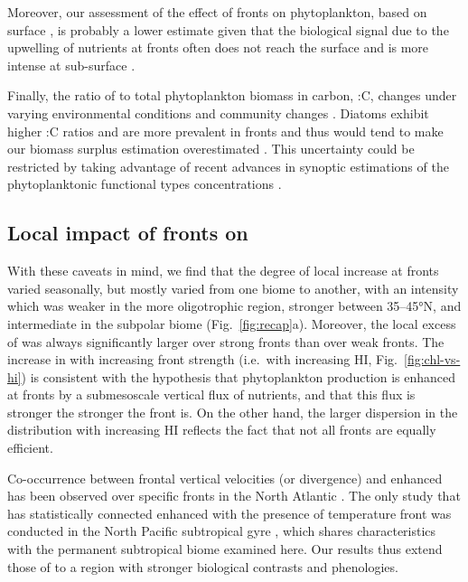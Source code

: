 Moreover, our assessment of the effect of fronts on phytoplankton, based on surface , is probably a lower estimate given that the biological signal due to the upwelling of nutrients at fronts often does not reach the surface and is more intense at sub-surface \citep{mourino_2004, ruiz_2019}.

Finally, the ratio of  to total phytoplankton biomass in carbon, :C, changes under varying environmental conditions and community changes \citep{behrenfeld_2015, halsey_2015, inomura_2022}.
Diatoms exhibit higher :C ratios and are more prevalent in fronts and thus would tend to make our biomass surplus estimation overestimated \citep{treguer_2018}.
This uncertainty could be restricted by taking advantage of recent advances in synoptic estimations of the phytoplanktonic functional types concentrations \citep{elhourany_2019}.

\subsection{Local impact of fronts on }

With these caveats in mind, we find that the degree of local  increase at fronts varied seasonally, but mostly varied from one biome to another, with an intensity which was weaker in the more oligotrophic region, stronger between 35--45°N, and intermediate in the subpolar biome (Fig.~\ref{fig:recap}a).
Moreover, the local excess of  was always significantly larger over strong fronts than over weak fronts.
The increase in  with increasing front strength (i.e.\ with increasing HI, Fig.~\ref{fig:chl-vs-hi}) is consistent with the hypothesis that phytoplankton production is enhanced at fronts by a submesoscale vertical flux of nutrients, and that this flux is stronger the stronger the front is.
On the other hand, the larger dispersion in the  distribution with increasing HI reflects the fact that not all fronts are equally efficient.

Co-occurrence between frontal vertical velocities (or divergence) and enhanced  has been observed over specific fronts in the North Atlantic \citep{mourino_2004, allen_2005, lehahn_2007}.
The only study that has statistically connected enhanced  with the presence of temperature front was conducted in the North Pacific subtropical gyre \citep{liu_2016}, which shares characteristics with the permanent subtropical biome examined here.
Our results thus extend those of \citet{liu_2016} to a region with stronger biological contrasts and phenologies.

